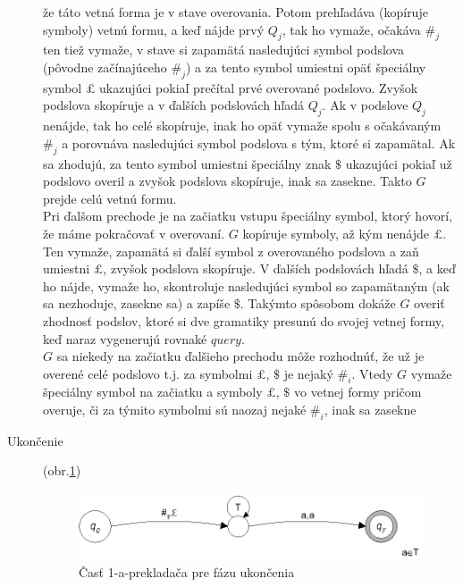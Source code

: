 \begin{dokaz}
\begin{description}
  že táto vetná forma je v stave overovania. Potom prehľadáva
  (kopíruje symboly) vetnú formu, a keď nájde prvý $Q_j$, tak ho
  vymaže, očakáva $\#_j$ ten tiež vymaže, v stave si zapamätá
  nasledujúci symbol podslova (pôvodne začínajúceho $\#_j$) a za
  tento symbol umiestni opäť špeciálny symbol $\pounds$ ukazujúci pokiaľ
  prečítal prvé overované podslovo. Zvyšok podslova skopíruje a v
  ďalších podslovách hľadá $Q_j$. Ak v podslove $Q_j$ nenájde, tak
  ho celé skopíruje, inak ho opäť vymaže spolu s očakávaným $\#_j$
  a porovnáva nasledujúci symbol podslova s tým, ktoré si
  zapamätal. Ak sa zhodujú, za tento symbol umiestni špeciálny
  znak $\$$ ukazujúci pokiaľ už podslovo overil a zvyšok podslova
  skopíruje, inak sa zasekne. Takto $G$ prejde celú vetnú formu.
  \\ Pri ďalšom prechode je na začiatku vstupu špeciálny symbol,
  ktorý hovorí, že máme pokračovať v overovaní. $G$ kopíruje
  symboly, až kým nenájde $\pounds$. Ten vymaže, zapamätá si ďalší
  symbol z overovaného podslova a zaň umiestni $\pounds$, zvyšok
  podslova skopíruje. V ďalších podslovách hľadá $\$$, a keď ho
  nájde, vymaže ho, skontroluje nasledujúci symbol so zapamätaným
  (ak sa nezhoduje, zasekne sa) a zapíše $\$$. Takýmto spôsobom
  dokáže $G$ overiť zhodnosť podslov, ktoré si dve gramatiky
  presunú do svojej vetnej formy, keď naraz vygenerujú rovnaké
  $query$.
  \\ $G$ sa niekedy na začiatku ďalšieho prechodu môže rozhodnúť,
  že už je overené celé podslovo t.j. za symbolmi $\pounds$, $\$$
  je nejaký $\#_i$. Vtedy $G$ vymaže špeciálny symbol na začiatku
  a symboly $\pounds$, $\$$ vo vetnej formy pričom overuje, či za
  týmito symbolmi sú naozaj nejaké $\#_i$, inak sa zasekne

  \item[Ukončenie] (obr.\ref{pcgsgs4})

\begin{figure}[ht]
  \centering
  \includegraphics{img/pcgsgs/pcgsgs4}
  \caption{Časť 1-a-prekladača pre fázu ukončenia}\label{pcgsgs4}
\end{figure}


\end{description}
\end{dokaz}
